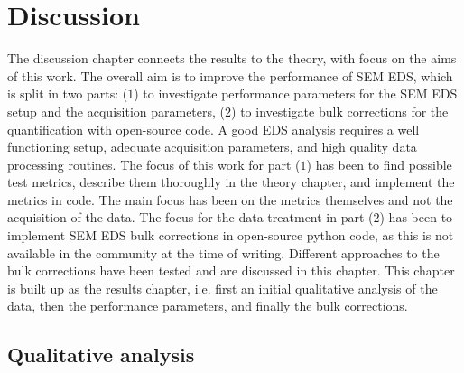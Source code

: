 %
\chapter{Discussion}
\label{ch:discussion}


The discussion chapter connects the results to the theory, with focus on the aims of this work.
The overall aim is to improve the performance of SEM EDS, which is split in two parts:
($1$) to investigate performance parameters for the SEM EDS setup and the acquisition parameters, ($2$) to investigate bulk corrections for the quantification with open-source code.
A good EDS analysis requires a well functioning setup, adequate acquisition parameters, and high quality data processing routines.
The focus of this work for part ($1$) has been to find possible test metrics, describe them thoroughly in the theory chapter, and implement the metrics in code.
The main focus has been on the metrics themselves and not the acquisition of the data.
The focus for the data treatment in part ($2$) has been to implement SEM EDS bulk corrections in open-source python code, as this is not available in the community at the time of writing.
Different approaches to the bulk corrections have been tested and are discussed in this chapter.
This chapter is built up as the results chapter, i.e. first an initial qualitative analysis of the data, then the performance parameters, and finally the bulk corrections.











\section{Qualitative analysis}
\label{discussion:qualitative_analysis}


